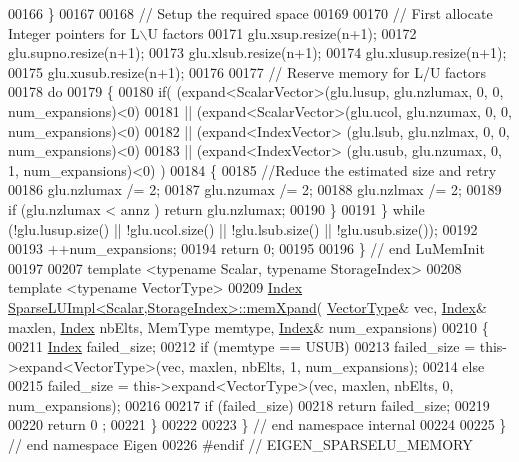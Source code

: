 \begin{DoxyCode}
00166   \}
00167   
00168   \textcolor{comment}{// Setup the required space }
00169   
00170   \textcolor{comment}{// First allocate Integer pointers for L\(\backslash\)U factors}
00171   glu.xsup.resize(n+1);
00172   glu.supno.resize(n+1);
00173   glu.xlsub.resize(n+1);
00174   glu.xlusup.resize(n+1);
00175   glu.xusub.resize(n+1);
00176 
00177   \textcolor{comment}{// Reserve memory for L/U factors}
00178   \textcolor{keywordflow}{do} 
00179   \{
00180     \textcolor{keywordflow}{if}(     (expand<ScalarVector>(glu.lusup, glu.nzlumax, 0, 0, num\_expansions)<0)
00181         ||  (expand<ScalarVector>(glu.ucol,  glu.nzumax,  0, 0, num\_expansions)<0)
00182         ||  (expand<IndexVector> (glu.lsub,  glu.nzlmax,  0, 0, num\_expansions)<0)
00183         ||  (expand<IndexVector> (glu.usub,  glu.nzumax,  0, 1, num\_expansions)<0) )
00184     \{
00185       \textcolor{comment}{//Reduce the estimated size and retry}
00186       glu.nzlumax /= 2;
00187       glu.nzumax /= 2;
00188       glu.nzlmax /= 2;
00189       \textcolor{keywordflow}{if} (glu.nzlumax < annz ) \textcolor{keywordflow}{return} glu.nzlumax; 
00190     \}
00191   \} \textcolor{keywordflow}{while} (!glu.lusup.size() || !glu.ucol.size() || !glu.lsub.size() || !glu.usub.size());
00192   
00193   ++num\_expansions;
00194   \textcolor{keywordflow}{return} 0;
00195   
00196 \} \textcolor{comment}{// end LuMemInit}
00197 
00207 \textcolor{keyword}{template} <\textcolor{keyword}{typename} Scalar, \textcolor{keyword}{typename} StorageIndex>
00208 \textcolor{keyword}{template} <\textcolor{keyword}{typename} VectorType>
00209 \hyperlink{namespace_eigen_a62e77e0933482dafde8fe197d9a2cfde}{Index} \hyperlink{group___sparse_l_u___module_a2a6465f1173fd8b74b2e5b8ceec53343}{SparseLUImpl<Scalar,StorageIndex>::memXpand}(
      \hyperlink{struct_vector_type}{VectorType}& vec, \hyperlink{namespace_eigen_a62e77e0933482dafde8fe197d9a2cfde}{Index}& maxlen, \hyperlink{namespace_eigen_a62e77e0933482dafde8fe197d9a2cfde}{Index} nbElts, MemType memtype, 
      \hyperlink{namespace_eigen_a62e77e0933482dafde8fe197d9a2cfde}{Index}& num\_expansions)
00210 \{
00211   \hyperlink{namespace_eigen_a62e77e0933482dafde8fe197d9a2cfde}{Index} failed\_size; 
00212   \textcolor{keywordflow}{if} (memtype == USUB)
00213      failed\_size = this->expand<VectorType>(vec, maxlen, nbElts, 1, num\_expansions);
00214   \textcolor{keywordflow}{else}
00215     failed\_size = this->expand<VectorType>(vec, maxlen, nbElts, 0, num\_expansions);
00216 
00217   \textcolor{keywordflow}{if} (failed\_size)
00218     \textcolor{keywordflow}{return} failed\_size; 
00219   
00220   \textcolor{keywordflow}{return} 0 ;  
00221 \}
00222 
00223 \} \textcolor{comment}{// end namespace internal}
00224 
00225 \} \textcolor{comment}{// end namespace Eigen}
00226 \textcolor{preprocessor}{#endif // EIGEN\_SPARSELU\_MEMORY}
\end{DoxyCode}
